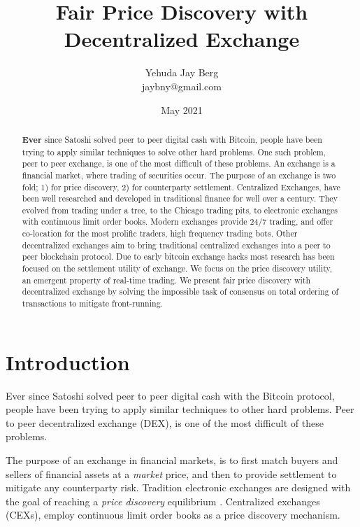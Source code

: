 \documentclass[12pt]{article}
\title{Fair Price Discovery with Decentralized Exchange}
\author{Yehuda Jay Berg \\jaybny@gmail.com}
\date{May 2021}
\begin{document}
\parindent 0cm
\parskip   6pt
\maketitle




\begin{abstract}
\textbf
\textbf{Ever }since  Satoshi  solved  peer  to  peer  digital  cash  with  Bitcoin,  people have  been  trying  to  apply  similar  techniques  to  solve  other  hard  problems. One such problem, peer to peer exchange, is one of the most difficult of these problems. An exchange is a financial market, where trading of securities occur. The purpose of an exchange is two fold;  1) for price discovery, 2) for counterparty settlement. Centralized Exchanges, have been well researched and developed in traditional finance for well over a century.  They evolved from trading under a tree, to the Chicago trading pits, to electronic exchanges with continuous limit order books. Modern exchanges provide 24/7 trading, and offer co-location for the most prolific traders, high frequency trading bots. Other decentralized exchanges aim to bring traditional centralized exchanges into a peer to peer blockchain protocol. Due to early bitcoin exchange hacks most research has been focused on the settlement utility of exchange. We focus on the price discovery utility, an emergent property of real-time trading. We present fair price discovery with decentralized exchange by solving the impossible task of consensus on total ordering of transactions to mitigate front-running.
\end{abstract}

\section{Introduction}
Ever since Satoshi solved peer to peer digital cash with the Bitcoin protocol, people have been trying to apply similar techniques to other hard problems. Peer to peer decentralized exchange (DEX), is one of the most difficult of these problems. 

The purpose of an exchange in financial markets, is to first match buyers and sellers of financial assets at a \emph{market} price, and then to provide settlement to mitigate any counterparty risk. Tradition electronic exchanges are designed with the goal of reaching a  \emph{price discovery} equilibrium \cite{francioni_schwartz_2017}. Centralized exchanges (CEXs), employ continuous limit order books as a price discovery mechanism. 
\end{document}
